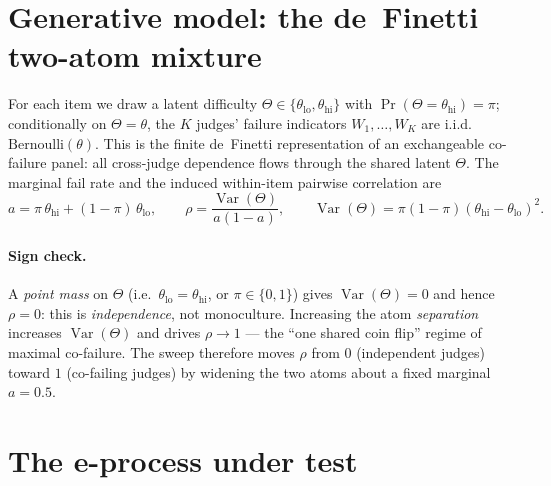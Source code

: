 \documentclass[11pt,a4paper]{article}
\begin{document}
\section{Generative model: the de~Finetti two-atom mixture}

For each item we draw a latent difficulty $\Theta \in \{\theta_{\mathrm{lo}},
\theta_{\mathrm{hi}}\}$ with $\Pr(\Theta = \theta_{\mathrm{hi}}) = \pi$;
conditionally on $\Theta = \theta$, the $K$ judges' failure indicators
$W_1,\dots,W_K$ are i.i.d.\ $\mathrm{Bernoulli}(\theta)$. This is the finite
de~Finetti representation of an exchangeable co-failure panel: all cross-judge
dependence flows through the shared latent $\Theta$. The marginal fail rate and
the induced within-item pairwise correlation are
\[
  a = \pi\,\theta_{\mathrm{hi}} + (1-\pi)\,\theta_{\mathrm{lo}},
  \qquad
  \rho = \frac{\operatorname{Var}(\Theta)}{a(1-a)},
  \qquad
  \operatorname{Var}(\Theta) = \pi(1-\pi)(\theta_{\mathrm{hi}}-\theta_{\mathrm{lo}})^2 .
\]

\paragraph{Sign check.} A \emph{point mass} on $\Theta$ (i.e.\
$\theta_{\mathrm{lo}} = \theta_{\mathrm{hi}}$, or $\pi\in\{0,1\}$) gives
$\operatorname{Var}(\Theta)=0$ and hence $\rho = 0$: this is \emph{independence},
not monoculture. Increasing the atom \emph{separation} increases
$\operatorname{Var}(\Theta)$ and drives $\rho \to 1$ --- the ``one shared coin
flip'' regime of maximal co-failure. The sweep therefore moves $\rho$ from $0$
(independent judges) toward $1$ (co-failing judges) by widening the two atoms
about a fixed marginal $a = 0.5$.

\section{The e-process under test}
\end{document}

